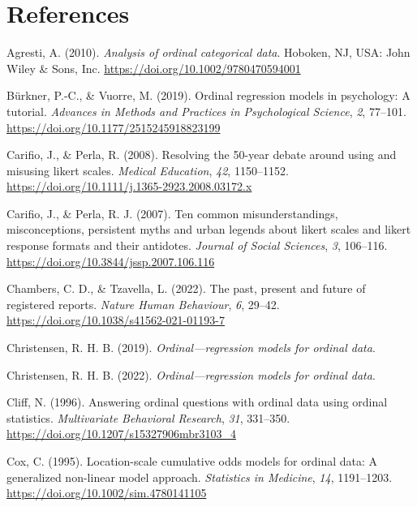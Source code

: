 \documentclass[
  man,floatsintext]{apa6}
\newlength{\cslhangindent}
\newenvironment{CSLReferences}[2] %
 {\begin{list}{}{%
  \setlength{\itemindent}{0pt}
  \setlength{\leftmargin}{0pt}
  \setlength{\parsep}{0pt}
  \ifodd #1
   \setlength{\leftmargin}{\cslhangindent}
   \setlength{\itemindent}{-1\cslhangindent}
  \fi
  \setlength{\itemsep}{#2\baselineskip}}}
 {\end{list}}
\begin{document}
\newpage

\section{References}\label{references}

\label{refs}
\begin{CSLReferences}{1}{0}
Agresti, A. (2010). \emph{Analysis of ordinal categorical data}. Hoboken, NJ, USA: John Wiley \& Sons, Inc. \url{https://doi.org/10.1002/9780470594001}

Bürkner, P.-C., \& Vuorre, M. (2019). Ordinal regression models in psychology: A tutorial. \emph{Advances in Methods and Practices in Psychological Science}, \emph{2}, 77--101. \url{https://doi.org/10.1177/2515245918823199}

Carifio, J., \& Perla, R. (2008). Resolving the 50-year debate around using and misusing likert scales. \emph{Medical Education}, \emph{42}, 1150--1152. \url{https://doi.org/10.1111/j.1365-2923.2008.03172.x}

Carifio, J., \& Perla, R. J. (2007). Ten common misunderstandings, misconceptions, persistent myths and urban legends about likert scales and likert response formats and their antidotes. \emph{Journal of Social Sciences}, \emph{3}, 106--116. \url{https://doi.org/10.3844/jssp.2007.106.116}

Chambers, C. D., \& Tzavella, L. (2022). The past, present and future of registered reports. \emph{Nature Human Behaviour}, \emph{6}, 29--42. \url{https://doi.org/10.1038/s41562-021-01193-7}

Christensen, R. H. B. (2019). \emph{Ordinal---regression models for ordinal data}.

Christensen, R. H. B. (2022). \emph{Ordinal---regression models for ordinal data}.

Cliff, N. (1996). Answering ordinal questions with ordinal data using ordinal statistics. \emph{Multivariate Behavioral Research}, \emph{31}, 331--350. \url{https://doi.org/10.1207/s15327906mbr3103_4}

Cox, C. (1995). Location-scale cumulative odds models for ordinal data: A generalized non-linear model approach. \emph{Statistics in Medicine}, \emph{14}, 1191--1203. \url{https://doi.org/10.1002/sim.4780141105}


\end{CSLReferences}
\end{document}

